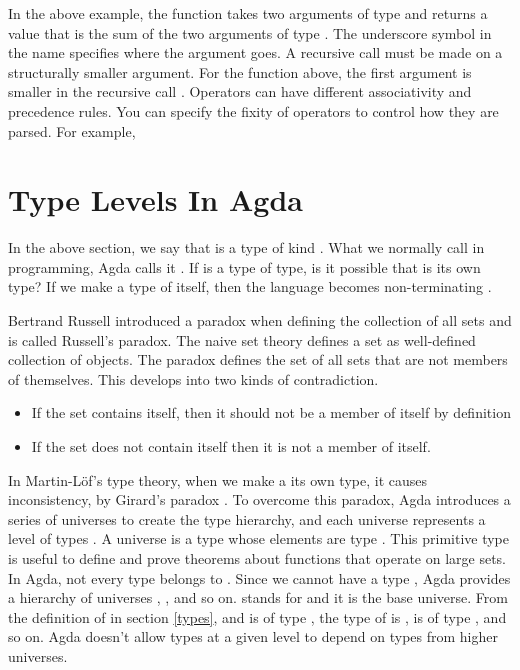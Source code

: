In the above example, the function \inline{_+_} takes two arguments of type
 and returns a value that is the sum of the two arguments of type
. The underscore symbol in the name specifies where the argument
goes. A recursive call must be made on a structurally smaller argument. For the
function \inline{_+_} above, the first argument  is smaller in the
recursive call . Operators can have different associativity and
precedence rules. You can specify the fixity of operators to control how they
are parsed. For example,

\section{Type Levels In Agda}
In the above section, we say that  is a type of kind .
What we normally call  in programming, Agda calls it .
If  is a type of type, is it possible that  is its own
type? If we make  a type of itself, then the language becomes
non-terminating \cite{AgdaTB}. 

Bertrand Russell introduced a paradox when defining the collection of all sets and
is called Russell's paradox. The naive set theory defines a set as well-defined
collection of objects. The paradox \cite{russell2020principles} defines the set
of all sets that are not members of themselves. This develops into two kinds of
contradiction.
\begin{itemize}
  \item If the set contains itself, then it should not be a member of itself by
  definition
  \item If the set does not contain itself then it is not a member of itself.
\end{itemize}

In Martin-Löf's type theory, when we make a  its own type, it causes
inconsistency, by Girard's paradox \cite{coquand1986analysis}. To overcome this
paradox, Agda introduces a series of universes to create the type hierarchy, and
each universe represents a level of types \cite{sortSystem}. A universe is a
type whose elements are type \cite{universeagda}. This primitive type is useful
to define and prove theorems about functions that operate on large sets. In Agda,
not every type belongs to . Since we cannot have a type , Agda provides a hierarchy of universes , ,
 and so on.  stands for  and it is the
base universe. From the definition of  in section \ref{types},
 and  is of type , the type of
 is ,  is of type , and so on.
Agda doesn't allow types at a given level to depend on types from higher
universes.  

